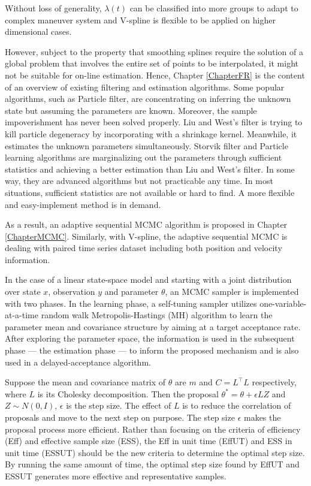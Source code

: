 Without loss of generality, $\lambda(t)$ can be classified into more groups to adapt to complex maneuver system and V-spline is flexible to be applied on higher dimensional cases. 

However, subject to the property that smoothing splines require the solution of a global problem that involves the entire set of points to be interpolated, it might not be suitable for on-line estimation. Hence, Chapter \ref{ChapterFR} is the content of an overview of existing filtering and estimation algorithms. Some popular algorithms, such as Particle filter, are concentrating on inferring the unknown state but assuming the parameters are known. Moreover, the sample impoverishment has never been solved properly. Liu and West's filter is trying to kill particle degeneracy by incorporating with a shrinkage kernel. Meanwhile, it estimates the unknown parameters simultaneously. Storvik filter and Particle learning algorithms are marginalizing out the parameters through sufficient statistics and achieving a better estimation than Liu and West's filter. In some way, they are advanced algorithms but not practicable any time. In most situations, sufficient statistics are not available or hard to find. A more flexible and easy-implement method is in demand. 
 
As a result, an adaptive sequential MCMC algorithm is proposed in Chapter \ref{ChapterMCMC}. Similarly, with V-spline, the adaptive sequential MCMC is dealing with paired time series dataset including both position and velocity information. 

In the case of a linear state-space model and starting with a joint distribution over state $x$, observation $y$ and parameter $\theta$, an MCMC sampler is implemented with two phases. In the learning phase, a self-tuning sampler utilizes one-variable-at-a-time random walk Metropolis-Hastings (MH) algorithm to learn the parameter mean and covariance structure by aiming at a target acceptance rate. After exploring the parameter space, the information is used in the subsequent phase --- the estimation phase --- to inform the proposed mechanism and is also used in a delayed-acceptance algorithm. 

Suppose the mean and covariance matrix of $\theta$ are $m$ and $C=L^\top L$ respectively, where $L$ is its Cholesky decomposition. Then the proposal $\theta^*=\theta + \epsilon LZ$ and $Z\sim N(0,I)$, $\epsilon$ is the step size. The effect of $L$ is to reduce the correlation of proposals and move to the next step on purpose. The step size $\epsilon$ makes the proposal process more efficient. Rather than focusing on the criteria of efficiency (Eff) and effective sample size (ESS), the Eff in unit time (EffUT) and ESS in unit time (ESSUT) should be the new criteria to determine the optimal step size. By running the same amount of time, the optimal step size found by EffUT and ESSUT generates more effective and representative samples. 

